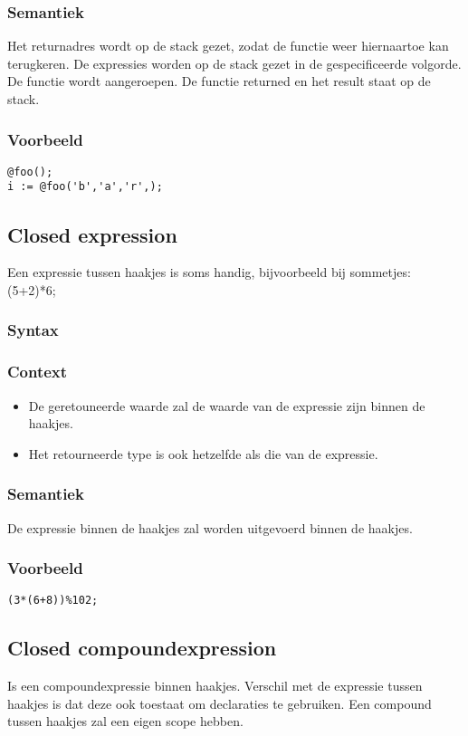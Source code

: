 \documentclass[]{article}
\begin{document}
\subsubsection{Semantiek}
Het returnadres wordt op de stack gezet, zodat de functie weer hiernaartoe kan terugkeren.
De expressies worden op de stack gezet in de gespecificeerde volgorde.
De functie wordt aangeroepen.
De functie returned en het result staat op de stack.
\subsubsection{Voorbeeld}
\begin{lstlisting}[style=SELMA]
@foo();
i := @foo('b','a','r',);
\end{lstlisting}


\subsection{Closed expression}
Een expressie tussen haakjes is soms handig, bijvoorbeeld bij sommetjes: (5+2)*6;
\subsubsection{Syntax}

\subsubsection{Context}
\begin{itemize}
\item De geretouneerde waarde zal de waarde van de expressie zijn binnen de haakjes.
\item Het retourneerde type is ook hetzelfde als die van de expressie.
\end{itemize}
\subsubsection{Semantiek}
De expressie binnen de haakjes zal worden uitgevoerd binnen de haakjes.
\subsubsection{Voorbeeld}
\begin{lstlisting}[style=SELMA]
(3*(6+8))%102;
\end{lstlisting}

\subsection{Closed compoundexpression}
Is een compoundexpressie binnen haakjes. Verschil met de expressie tussen haakjes is dat deze ook toestaat om declaraties te gebruiken. Een compound tussen haakjes zal een eigen scope hebben.
\end{document}
